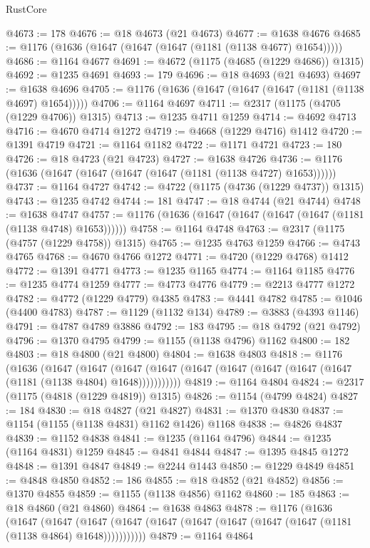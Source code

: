 \begin{lexlean}{RustCore}
\begin{coremodule}
@4673 := 178
@4676 := @18 @4673 (@21 @4673)
@4677 := @1638 @4676
@4685 := @1176 (@1636 (@1647 (@1647 (@1647 (@1181 (@1138 @4677) @1654)))))
@4686 := @1164 @4677
@4691 := @4672 (@1175 (@4685 (@1229 @4686)) @1315)
@4692 := @1235 @4691
@4693 := 179
@4696 := @18 @4693 (@21 @4693)
@4697 := @1638 @4696
@4705 := @1176 (@1636 (@1647 (@1647 (@1647 (@1181 (@1138 @4697) @1654)))))
@4706 := @1164 @4697
@4711 := @2317 (@1175 (@4705 (@1229 @4706)) @1315)
@4713 := @1235 @4711 @1259
@4714 := @4692 @4713
@4716 := @4670 @4714 @1272
@4719 := @4668 (@1229 @4716) @1412
@4720 := @1391 @4719
@4721 := @1164 @1182
@4722 := @1171 @4721
@4723 := 180
@4726 := @18 @4723 (@21 @4723)
@4727 := @1638 @4726
@4736 := @1176 (@1636 (@1647 (@1647 (@1647 (@1647 (@1181 (@1138 @4727) @1653))))))
@4737 := @1164 @4727
@4742 := @4722 (@1175 (@4736 (@1229 @4737)) @1315)
@4743 := @1235 @4742
@4744 := 181
@4747 := @18 @4744 (@21 @4744)
@4748 := @1638 @4747
@4757 := @1176 (@1636 (@1647 (@1647 (@1647 (@1647 (@1181 (@1138 @4748) @1653))))))
@4758 := @1164 @4748
@4763 := @2317 (@1175 (@4757 (@1229 @4758)) @1315)
@4765 := @1235 @4763 @1259
@4766 := @4743 @4765
@4768 := @4670 @4766 @1272
@4771 := @4720 (@1229 @4768) @1412
@4772 := @1391 @4771
@4773 := @1235 @1165
@4774 := @1164 @1185
@4776 := @1235 @4774 @1259
@4777 := @4773 @4776
@4779 := @2213 @4777 @1272
@4782 := @4772 (@1229 @4779) @4385
@4783 := @4441 @4782
@4785 := @1046 (@4400 @4783)
@4787 := @1129 (@1132 @134)
@4789 := @3883 (@4393 @1146)
@4791 := @4787 @4789 @3886
@4792 := 183
@4795 := @18 @4792 (@21 @4792)
@4796 := @1370 @4795
@4799 := @1155 (@1138 @4796) @1162
@4800 := 182
@4803 := @18 @4800 (@21 @4800)
@4804 := @1638 @4803
@4818 := @1176
    (@1636
      (@1647
        (@1647
          (@1647 (@1647 (@1647 (@1647 (@1647 (@1647 (@1647 (@1181 (@1138 @4804) @1648)))))))))))
@4819 := @1164 @4804
@4824 := @2317 (@1175 (@4818 (@1229 @4819)) @1315)
@4826 := @1154 (@4799 @4824)
@4827 := 184
@4830 := @18 @4827 (@21 @4827)
@4831 := @1370 @4830
@4837 := @1154 (@1155 (@1138 @4831) @1162 @1426) @1168
@4838 := @4826 @4837
@4839 := @1152 @4838
@4841 := @1235 (@1164 @4796)
@4844 := @1235 (@1164 @4831) @1259
@4845 := @4841 @4844
@4847 := @1395 @4845 @1272
@4848 := @1391 @4847
@4849 := @2244 @1443
@4850 := @1229 @4849
@4851 := @4848 @4850
@4852 := 186
@4855 := @18 @4852 (@21 @4852)
@4856 := @1370 @4855
@4859 := @1155 (@1138 @4856) @1162
@4860 := 185
@4863 := @18 @4860 (@21 @4860)
@4864 := @1638 @4863
@4878 := @1176
    (@1636
      (@1647
        (@1647
          (@1647 (@1647 (@1647 (@1647 (@1647 (@1647 (@1647 (@1181 (@1138 @4864) @1648)))))))))))
@4879 := @1164 @4864

\end{coremodule}
\end{lexlean}
